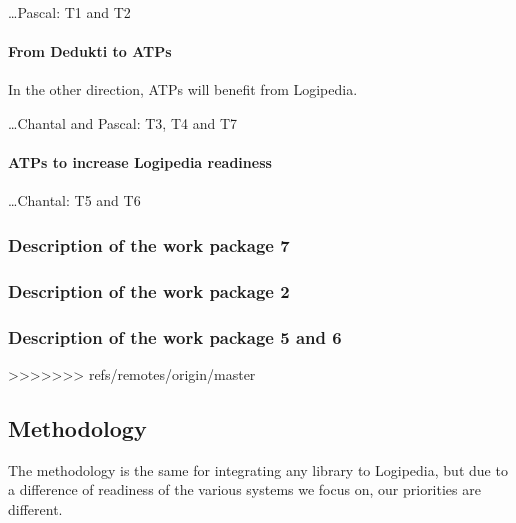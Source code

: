 \dots Pascal: T1 and T2


\paragraph{From {\sf Dedukti} to ATPs}

In the other direction, ATPs will benefit from {\sf Logipedia}.

\dots Chantal and Pascal: T3, T4 and T7


\paragraph{ATPs to increase {\sf Logipedia} readiness}

\dots Chantal: T5 and T6


\subsubsection{Description of the work package 7}

\subsubsection{Description of the work package 2}

\subsubsection{Description of the work package 5 and 6}
>>>>>>> refs/remotes/origin/master

\subsection{Methodology}

The methodology is the same for integrating any library to {\sf Logipedia},
but due to a difference of readiness of the various systems we focus on,
our priorities are different.

